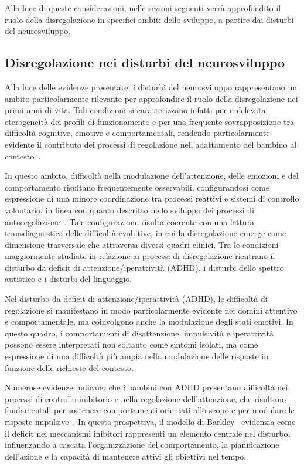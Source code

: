         Alla luce di queste considerazioni, nelle sezioni seguenti verrà approfondito il ruolo della disregolazione in specifici ambiti dello sviluppo, a partire dai disturbi del neurosviluppo.

        \subsection{Disregolazione nei disturbi del neurosviluppo}
        \label{sec:2_3_1}

            Alla luce delle evidenze presentate, i disturbi del neurosviluppo rappresentano un ambito particolarmente rilevante per approfondire il ruolo della disregolazione nei primi anni di vita. Tali condizioni si caratterizzano infatti per un'elevata eterogeneità dei profili di funzionamento e per una frequente sovrapposizione tra difficoltà cognitive, emotive e comportamentali, rendendo particolarmente evidente il contributo dei processi di regolazione nell'adattamento del bambino al contesto~\cite{astle2022,blair2015}.

            In questo ambito, difficoltà nella modulazione dell'attenzione, delle emozioni e del comportamento risultano frequentemente osservabili, configurandosi come espressione di una minore coordinazione tra processi reattivi e sistemi di controllo volontario, in linea con quanto descritto nello sviluppo dei processi di autoregolazione~\cite{blair2015,diamond2013}. Tale configurazione risulta coerente con una lettura transdiagnostica delle difficoltà evolutive, in cui la disregolazione emerge come dimensione trasversale che attraversa diversi quadri clinici. Tra le condizioni maggiormente studiate in relazione ai processi di disregolazione rientrano il disturbo da deficit di attenzione/iperattività (ADHD), i disturbi dello spettro autistico e i disturbi del linguaggio.

            Nel disturbo da deficit di attenzione/iperattività (ADHD), le difficoltà di regolazione si manifestano in modo particolarmente evidente nei domini attentivo e comportamentale, ma coinvolgono anche la modulazione degli stati emotivi. In questo quadro, i comportamenti di disattenzione, impulsività e iperattività possono essere interpretati non soltanto come sintomi isolati, ma come espressione di una difficoltà più ampia nella modulazione delle risposte in funzione delle richieste del contesto.

            Numerose evidenze indicano che i bambini con ADHD presentano difficoltà nei processi di controllo inibitorio e nella regolazione dell'attenzione, che risultano fondamentali per sostenere comportamenti orientati allo scopo e per modulare le risposte impulsive~\cite{diamond2013,zelazo2020,barkley1997}. In questa prospettiva, il modello di Barkley~\cite{barkley1997} evidenzia come il deficit nei meccanismi inibitori rappresenti un elemento centrale nel disturbo, influenzando a cascata l'organizzazione del comportamento, la pianificazione dell'azione e la capacità di mantenere attivi gli obiettivi nel tempo.

